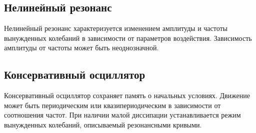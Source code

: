 \documentclass[10pt]{article}
\begin{document}
\subsection*{Нелинейный резонанс}
Нелинейный резонанс характеризуется изменением амплитуды и частоты вынужденных колебаний в зависимости от параметров воздействия. Зависимость амплитуды от частоты может быть неоднозначной.

\subsection*{Консервативный осциллятор}
Консервативный осциллятор сохраняет память о начальных условиях. Движение может быть периодическим или квазипериодическим в зависимости от соотношения частот. При наличии малой диссипации устанавливается режим вынужденных колебаний, описываемый резонансными кривыми.
\end{document}

